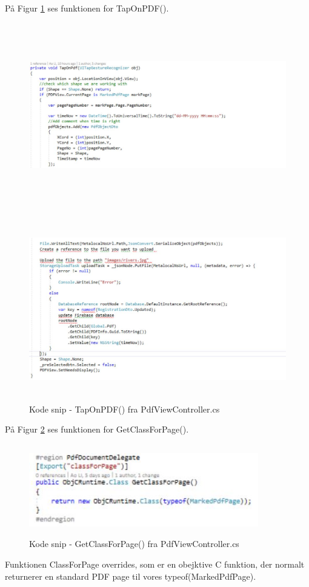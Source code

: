 På Figur \ref{fig:TapOnPDF2} ses funktionen for TapOnPDF().
\begin{figure}[H] %
	\centering
	\includegraphics[height=8cm, width=15cm]{../ArkitekturDesign/Design/RegisterPDF/TapOnPDF1}
\end{figure}
\begin{figure}[H] %
	\centering
	\includegraphics[height=8cm, width=15cm]{../ArkitekturDesign/Design/RegisterPDF/TapOnPDF2}
	\caption{Kode snip - TapOnPDF() fra PdfViewController.cs}
	\label{fig:TapOnPDF2}
\end{figure}


\clearpage

På Figur \ref{fig:ClassPage} ses funktionen for GetClassForPage().
\begin{figure}[H] %
	\centering
	\includegraphics[height=4cm, width=10cm]{../ArkitekturDesign/Design/RegisterPDF/ClassPage}
	\caption{Kode snip - GetClassForPage() fra PdfViewController.cs}
	\label{fig:ClassPage}
\end{figure}
Funktionen ClassForPage overrides, som er en obejktive C funktion, der normalt returnerer en standard PDF page til vores typeof(MarkedPdfPage).

